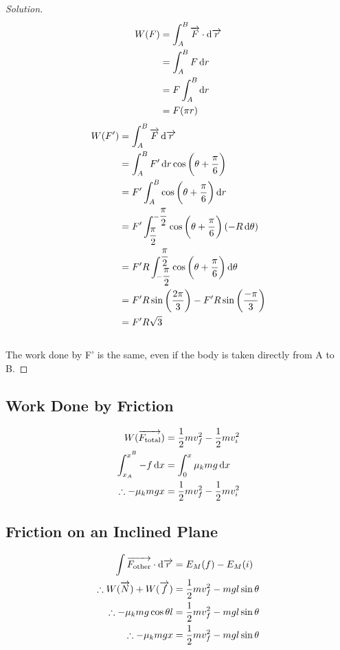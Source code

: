 \documentclass[fleqn]{article}
\theoremstyle{definition}
\theoremstyle{theorem}
\newenvironment{solution}
{\begin{proof}[Solution]\let\qed\relax}
	{\end{proof}}
\begin{document}
\begin{solution}
	{
	\color{red}
	\begin{align*}
		W(F) &= \int_{A}^{B} \overrightarrow{F} \cdot \dif \overrightarrow{r} \\
		&= \int_{A}^{B} F \dif r \\
		&= F \int_{A}^{B} \dif r \\
		&= F(\pi r)
	\end{align*}
	}
	{
	\color{blue}
	\begin{align*}
		W(F') &= \int_{A}^{B} \overrightarrow{F} \dif \overrightarrow{r} \\
		&= \int_{A}^{B} F' \dif r \cos \left(\theta + \dfrac{\pi}{6}\right) \\
		&= F' \int_{A}^{B} \cos \left(\theta + \dfrac{\pi}{6}\right) \dif r \\
		&= F' \int_{\dfrac{\pi}{2}}^{- \dfrac{\pi}{2}} \cos \left(\theta + \dfrac{\pi}{6}\right) (-R \dif \theta) \\
		&= F' R \int_{-\dfrac{\pi}{2}}^{\dfrac{\pi}{2}} \cos \left(\theta + \dfrac{\pi}{6}\right) \dif \theta \\
		&= F' R \sin \left(\dfrac{2 \pi}{3}\right) - F' R \sin \left(\dfrac{-\pi}{3}\right) \\
		&= F' R \sqrt{3}
	\end{align*}
	}\\
	The work done by {\color{blue} F'} is the same, even if the body is taken directly from A to B.
\end{solution}
\subsection{Work Done by Friction}

\begin{align*}
	W(\overrightarrow{F_{\text{total}}}) &= \dfrac{1}{2} m v_f^2 - \dfrac{1}{2} m v_i^2 \\
	\int_{x_A}^{x^B} - f \dif x &= \int_{0}^{x} \mu_k m g \dif x \\
	\therefore - \mu_k m g x &= \dfrac{1}{2} m v_f^2 - \dfrac{1}{2} m v_i^2
\end{align*}

\subsection{Friction on an Inclined Plane}

%	

\begin{align*}
	\int \overrightarrow{F_{\text{other}}} \cdot \dif \overrightarrow{r} &= E_M(f) - E_M(i) \\
	\therefore W(\overrightarrow{N}) + W(\overrightarrow{f}) &= \dfrac{1}{2} m v_f^2 -m g l \sin \theta \\
	\therefore - \mu_k m g \cos \theta l &= \dfrac{1}{2} m v_f^2 - m g l \sin \theta \\
	\therefore - \mu_k m g x &= \dfrac{1}{2} m v_f^2 - m g l \sin \theta
\end{align*}
\end{document}
